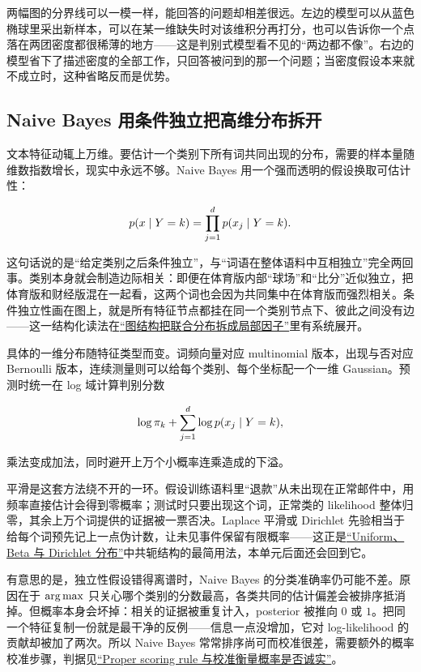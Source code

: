 两幅图的分界线可以一模一样，能回答的问题却相差很远。左边的模型可以从蓝色椭球里采出新样本，可以在某一维缺失时对该维积分再打分，也可以告诉你一个点落在两团密度都很稀薄的地方——这是判别式模型看不见的``两边都不像''。右边的模型省下了描述密度的全部工作，只回答被问到的那一个问题；当密度假设本来就不成立时，这种省略反而是优势。

\subsection{Naive Bayes 用条件独立把高维分布拆开}

文本特征动辄上万维。要估计一个类别下所有词共同出现的分布，需要的样本量随维数指数增长，现实中永远不够。Naive Bayes 用一个强而透明的假设换取可估计性：

\[
p(x\mid Y=k)=\prod_{j=1}^dp(x_j\mid Y=k).
\]

这句话说的是``给定类别之后条件独立''，与``词语在整体语料中互相独立''完全两回事。类别本身就会制造边际相关：即便在体育版内部``球场''和``比分''近似独立，把体育版和财经版混在一起看，这两个词也会因为共同集中在体育版而强烈相关。条件独立性画在图上，就是所有特征节点都挂在同一个类别节点下、彼此之间没有边——这一结构化读法在\hyperref[sec:13-Machine-Learning/07-Graphical-and-Sequential-Models/01]{``图结构把联合分布拆成局部因子''}里有系统展开。

具体的一维分布随特征类型而变。词频向量对应 multinomial 版本，出现与否对应 Bernoulli 版本，连续测量则可以给每个类别、每个坐标配一个一维 Gaussian。预测时统一在 log 域计算判别分数

\[
\log\pi_k+\sum_{j=1}^d\log p(x_j\mid Y=k),
\]

乘法变成加法，同时避开上万个小概率连乘造成的下溢。

平滑是这套方法绕不开的一环。假设训练语料里``退款''从未出现在正常邮件中，用频率直接估计会得到零概率；测试时只要出现这个词，正常类的 likelihood 整体归零，其余上万个词提供的证据被一票否决。Laplace 平滑或 Dirichlet 先验相当于给每个词预先记上一点伪计数，让未见事件保留有限概率——这正是\hyperref[sec:05-Probability/06-Common-Distributions/04]{``Uniform、Beta 与 Dirichlet 分布''}中共轭结构的最简用法，本单元后面还会回到它。

有意思的是，独立性假设错得离谱时，Naive Bayes 的分类准确率仍可能不差。原因在于 \(\operatorname*{arg\,max}\) 只关心哪个类别的分数最高，各类共同的估计偏差会被排序抵消掉。但概率本身会坏掉：相关的证据被重复计入，posterior 被推向 \(0\) 或 \(1\)。把同一个特征复制一份就是最干净的反例——信息一点没增加，它对 log-likelihood 的贡献却被加了两次。所以 Naive Bayes 常常排序尚可而校准很差，需要额外的概率校准步骤，判据见\hyperref[sec:11-Mathematical-Statistics/07-Statistical-Decision-and-Reliable-Prediction/04]{``Proper scoring rule 与校准衡量概率是否诚实''}。

